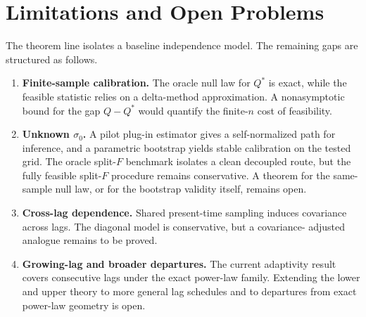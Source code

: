 \section{Limitations and Open Problems}
\label{sec:limitations}

The theorem line isolates a baseline independence model. The remaining gaps are
structured as follows.

\begin{enumerate}[leftmargin=*,label=(\arabic*)]
\item \textbf{Finite-sample calibration.} The oracle null law for $Q^*$ is exact,
while the feasible statistic relies on a delta-method approximation. A
nonasymptotic bound for the gap $Q-Q^*$ would quantify the finite-$n$ cost of
feasibility.

\item \textbf{Unknown $\sigma_0$.} A pilot plug-in estimator gives a
self-normalized path for inference, and a parametric bootstrap yields stable
calibration on the tested grid. The oracle split-$F$ benchmark isolates a clean
decoupled route, but the fully feasible split-$F$ procedure remains
conservative. A theorem for the same-sample null law, or for the bootstrap
validity itself, remains open.

\item \textbf{Cross-lag dependence.} Shared present-time sampling induces
covariance across lags. The diagonal model is conservative, but a covariance-
adjusted analogue remains to be proved.

\item \textbf{Growing-lag and broader departures.} The current adaptivity result
covers consecutive lags under the exact power-law family. Extending the lower
and upper theory to more general lag schedules and to departures from exact
power-law geometry is open.
\end{enumerate}
